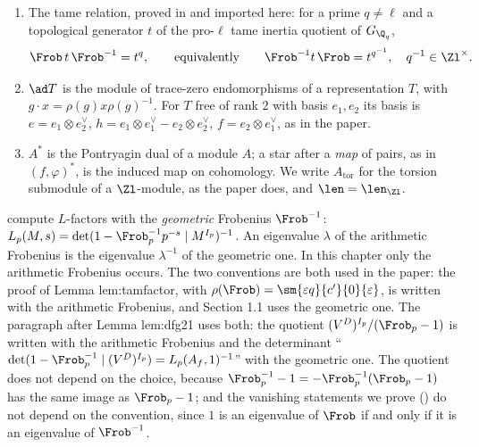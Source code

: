 \begin{convention}
\begin{enumerate}[label=(\alph*)]
\item The tame relation, proved in  and imported here: for a prime $q\ne\ell$ and a topological generator $t$ of the pro-$\ell$ tame inertia
quotient of $G_{\Q_q}$,
\[
\Frob\,t\,\Frob^{-1}=t^{q},\qquad\text{equivalently}\qquad \Frob^{-1}t\,\Frob=t^{q^{-1}},\quad q^{-1}\in\Zl^\times .
\]
\item $\ad T$ is the module of trace-zero endomorphisms of a representation $T$, with $g\cdot x=\rho(g)x\rho(g)^{-1}$. For $T$ free of rank $2$ with basis
$e_1,e_2$ its basis is $e=e_1\otimes e_2^\vee$, $h=e_1\otimes e_1^\vee-e_2\otimes e_2^\vee$, $f=e_2\otimes e_1^\vee$, as in the paper.
\item $A^*$ is the Pontryagin dual of a module $A$; a star after a \emph{map} of pairs, as in $(f,\varphi)^*$, is the induced map on cohomology. We
write $A_{\mathrm{tor}}$ for the torsion submodule of a $\Zl$-module, as the paper does, and $\len=\len_{\Zl}$.
\end{enumerate}
\end{convention}

\begin{warning}\label{warn:cohomology:frobenius}
 compute $L$-factors with the \emph{geometric} Frobenius $\Frob^{-1}$:
$L_p(M,s)=\det(1-\Frob_p^{-1}p^{-s}\mid M^{I_p})^{-1}$. An eigenvalue $\lambda$ of the arithmetic Frobenius is the eigenvalue $\lambda^{-1}$ of the
geometric one. In this chapter only the arithmetic Frobenius occurs. The two conventions are both used in the paper: the proof of Lemma lem:tamfactor,
with $\rho(\Frob)=\sm{\varepsilon q}{c'}{0}{\varepsilon}$, is written with the arithmetic Frobenius, and Section 1.1 uses the geometric one. The paragraph after Lemma lem:dfg21 uses both: the quotient
$(V^D)^{I_p}/(\Frob_p-1)$ is written with the arithmetic Frobenius and the determinant ``$\det(1-\Frob_p^{-1}\mid(V^D)^{I_p})=L_p(A_f,1)^{-1}$'' with the geometric
one. The quotient does not depend on the choice, because $\Frob_p^{-1}-1=-\Frob_p^{-1}(\Frob_p-1)$ has the same image as $\Frob_p-1$; and the vanishing statements we prove
() do not depend on the convention, since $1$ is an eigenvalue of $\Frob$ if and only if it is an eigenvalue of $\Frob^{-1}$.
\end{warning}

